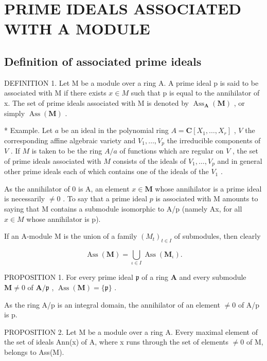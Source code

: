 \section{PRIME IDEALS ASSOCIATED WITH A MODULE}

\subsection{Definition of associated prime ideals}

DEFINITION 1. Let M be a module over a ring A. A prime ideal p is said to be associated with M if there exists \(x \in M\) such that p is equal to the annihilator of x. The set of prime ideals associated with M is denoted by \(\operatorname{Ass}_{\mathbf{A}}(\mathbf{M})\) , or simply \(\operatorname{Ass}(\mathbf{M})\) .

* Example. Let \(a\) be an ideal in the polynomial ring \(A = \mathbf{C}[X_1, \ldots, X_r]\) , \(V\) the corresponding affine algebraic variety and \(V_1, \ldots, V_p\) the irreducible components of \(V\) . If \(M\) is taken to be the ring \(A/a\) of functions which are regular on \(V\) , the set of prime ideals associated with \(M\) consists of the ideals of \(V_1, \ldots, V_p\) and in general other prime ideals each of which contains one of the ideals of the \(V_1\) .

As the annihilator of 0 is A, an element \(x \in \mathbf{M}\) whose annihilator is a prime ideal is necessarily \(\neq 0\) . To say that a prime ideal \(p\) is associated with M amounts to saying that M contains a submodule isomorphic to A/p (namely Ax, for all \(x \in M\) whose annihilator is p).

If an A-module M is the union of a family \((M_{t})_{t\in I}\) of submodules, then clearly

\[
\operatorname{Ass} (\mathbf {M}) = \bigcup_ {\iota \in I} \operatorname{Ass} \left(\mathbf {M} _ {\iota}\right).\tag{1}
\]

PROPOSITION 1. For every prime ideal \(\mathfrak{p}\) of a ring \(\mathbf{A}\) and every submodule \(\mathbf{M} \neq 0\) of \(\mathbf{A} / \mathfrak{p}\) , \(\operatorname{Ass}(\mathbf{M}) = \{\mathfrak{p}\}\) .

As the ring A/p is an integral domain, the annihilator of an element \(\neq0\) of A/p is p.

PROPOSITION 2. Let M be a module over a ring A. Every maximal element of the set of ideals Ann(x) of A, where x runs through the set of elements \(\neq0\) of M, belongs to Ass(M).

